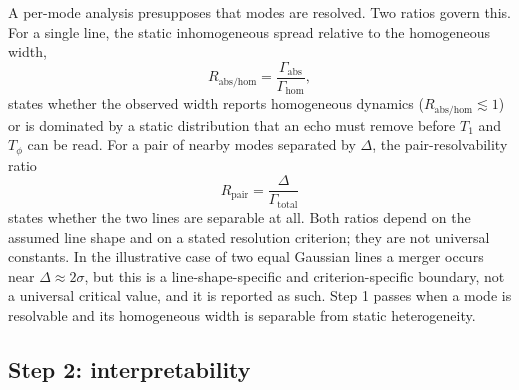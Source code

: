 A per-mode analysis presupposes that modes are resolved. Two ratios govern this. For a single line, the static inhomogeneous spread relative to the homogeneous width,
\begin{equation}
R_{\mathrm{abs/hom}} = \frac{\Gamma_{\mathrm{abs}}}{\Gamma_{\mathrm{hom}}},
\end{equation}
states whether the observed width reports homogeneous dynamics ($R_{\mathrm{abs/hom}} \lesssim 1$) or is dominated by a static distribution that an echo must remove before $T_1$ and $T_\phi$ can be read. For a pair of nearby modes separated by $\Delta$, the pair-resolvability ratio
\begin{equation}
R_{\mathrm{pair}} = \frac{\Delta}{\Gamma_{\mathrm{total}}}
\end{equation}
states whether the two lines are separable at all. Both ratios depend on the assumed line shape and on a stated resolution criterion; they are not universal constants. In the illustrative case of two equal Gaussian lines a merger occurs near $\Delta \approx 2\sigma$, but this is a line-shape-specific and criterion-specific boundary, not a universal critical value, and it is reported as such. Step 1 passes when a mode is resolvable and its homogeneous width is separable from static heterogeneity.

\subsection{Step 2: interpretability}

